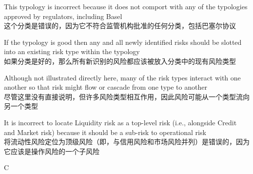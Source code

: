 \documentclass{article}
\begin{document}
    \begin{choices}
        \item This typology is incorrect because it does not comport with any of the typologies approved by regulators, including Basel
        \\这个分类是错误的，因为它不符合监管机构批准的任何分类，包括巴塞尔协议
        \item If the typology is good then any and all newly identified risks should be slotted into an existing risk type within the typology
        \\如果分类是好的，那么所有新识别的风险都应该被放入分类中的现有风险类型
        \item Although not illustrated directly here, many of the risk types interact with one another so that risk might flow or cascade from one type to another
        \\尽管这里没有直接说明，但许多风险类型相互作用，因此风险可能从一个类型流向另一个类型
        \item It is incorrect to locate Liquidity risk as a top-level risk (i.e., alongside Credit and Market risk) because it should be a sub-risk to operational risk
        \\将流动性风险定位为顶级风险（即，与信用风险和市场风险并列）是错误的，因为它应该是操作风险的一个子风险
    \end{choices}
    
    \begin{correctanswer}
    C
    \end{correctanswer}
    
\end{document}
